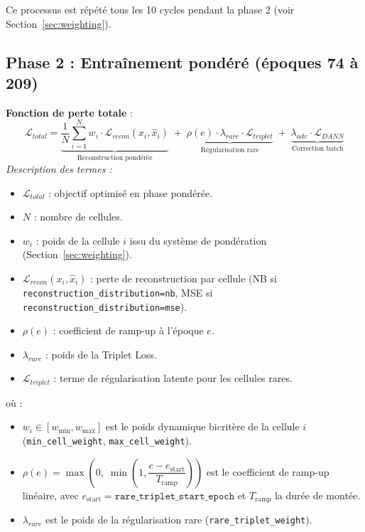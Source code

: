 \documentclass[11pt,a4paper]{article}
\begin{document}
Ce processus est r\'ep\'et\'e tous les 10 cycles pendant la phase 2 (voir Section~\ref{sec:weighting}).

\subsection{Phase 2 : Entra\^inement pond\'er\'e (\'epoques 74 \`a 209)}
\label{sec:phase2}

\textbf{Fonction de perte totale} :
\[
  \boxed{\mathcal{L}_{total} = \underbrace{\frac{1}{N}\sum_{i=1}^{N} w_i \cdot \mathcal{L}_{recon}(x_i, \hat{x}_i)}_{\text{Reconstruction pond\'er\'ee}} \;+\; \underbrace{\rho(e) \cdot \lambda_{rare} \cdot \mathcal{L}_{triplet}}_{\text{R\'egularisation rare}} \;+\; \underbrace{\lambda_{adv} \cdot \mathcal{L}_{DANN}}_{\text{Correction batch}}}
\]
\textit{Description des termes :}
\begin{itemize}[nosep]
  \item $\mathcal{L}_{total}$ : objectif optimis\'e en phase pond\'er\'ee.
  \item $N$ : nombre de cellules.
  \item $w_i$ : poids de la cellule $i$ issu du syst\`eme de pond\'eration (Section~\ref{sec:weighting}).
  \item $\mathcal{L}_{recon}(x_i,\hat{x}_i)$ : perte de reconstruction par cellule (NB si \texttt{reconstruction\_distribution=nb}, MSE si \texttt{reconstruction\_distribution=mse}).
  \item $\rho(e)$ : coefficient de ramp-up \`a l'\'epoque $e$.
  \item $\lambda_{rare}$ : poids de la Triplet Loss.
  \item $\mathcal{L}_{triplet}$ : terme de r\'egularisation latente pour les cellules rares.
\end{itemize}

o\`u :
\begin{itemize}[nosep]
  \item $w_i \in [w_{\min}, w_{\max}]$ est le poids dynamique bicrit\`ere de la cellule $i$ (\texttt{min\_cell\_weight}, \texttt{max\_cell\_weight}).
  \item $\rho(e) = \max\!\left(0,\; \min\!\left(1, \dfrac{e - e_{\text{start}}}{T_{\text{ramp}}}\right)\right)$ est le coefficient de ramp-up lin\'eaire, avec $e_{\text{start}}=\texttt{rare\_triplet\_start\_epoch}$ et $T_{\text{ramp}}$ la dur\'ee de mont\'ee.
  \item $\lambda_{rare}$ est le poids de la r\'egularisation rare (\texttt{rare\_triplet\_weight}).
\end{itemize}
\end{document}

